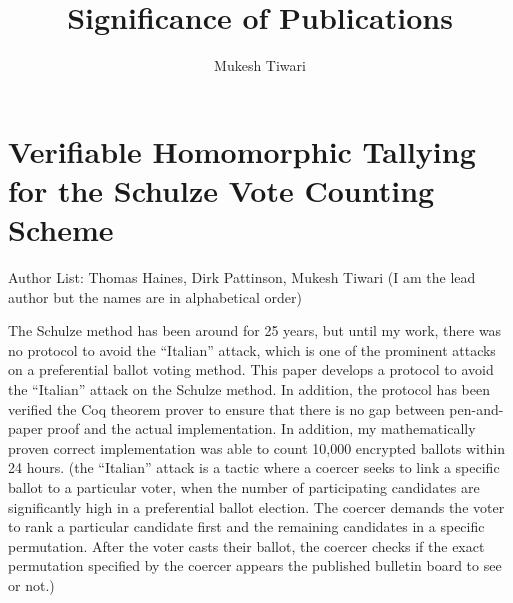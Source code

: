 \documentclass[a4paper]{article}
\title{Significance of Publications}
\author{Mukesh Tiwari}
\date{}
\begin{document}
\fontsize{12}{15}
\selectfont
\maketitle



\section{Verifiable Homomorphic Tallying for the Schulze Vote Counting Scheme}
Author List: Thomas Haines, Dirk Pattinson, Mukesh Tiwari (I am the lead author 
but the names are in alphabetical order)


The Schulze method has been around for 25 years, but until my work, there was no protocol to 
avoid the ``Italian'' attack, which is one of the prominent attacks on a 
preferential ballot voting method. This paper develops a protocol to 
avoid the ``Italian'' attack on the Schulze method. In addition, the protocol has been
verified the Coq theorem prover to ensure that there 
is no gap between pen-and-paper proof and the actual implementation. In addition, 
my mathematically proven correct implementation was able to count 10,000 encrypted 
ballots within 24 hours.
(the ``Italian'' attack is a tactic where a coercer seeks to link a specific ballot 
to a particular voter, when the number of participating candidates 
are significantly high in a preferential ballot election. 
The coercer demands the voter to rank a particular 
candidate first and the remaining candidates in a specific permutation. After the 
voter casts their ballot, the coercer checks if 
the exact permutation specified by the coercer appears the published bulletin board to see or not.)
\end{document}

